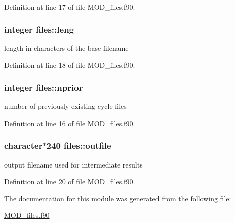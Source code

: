 Definition at line 17 of file M\-O\-D\-\_\-files.\-f90.

\hypertarget{classfiles_af9be68aa5c55ff7ddb877ea03560ccdc}{
\subsubsection[{leng}]{\setlength{\rightskip}{0pt plus 5cm}integer files\-::leng}}\label{classfiles_af9be68aa5c55ff7ddb877ea03560ccdc}


length in characters of the base filename 



Definition at line 18 of file M\-O\-D\-\_\-files.\-f90.

\hypertarget{classfiles_ac7f9a096a71e77d55c9a013df61bd110}{
\subsubsection[{nprior}]{\setlength{\rightskip}{0pt plus 5cm}integer files\-::nprior}}\label{classfiles_ac7f9a096a71e77d55c9a013df61bd110}


number of previously existing cycle files 



Definition at line 16 of file M\-O\-D\-\_\-files.\-f90.

\hypertarget{classfiles_a6462c022456a36144ec8a11250b87eeb}{
\subsubsection[{outfile}]{\setlength{\rightskip}{0pt plus 5cm}character$\ast$240 files\-::outfile}}\label{classfiles_a6462c022456a36144ec8a11250b87eeb}


output filename used for intermediate results 



Definition at line 20 of file M\-O\-D\-\_\-files.\-f90.



The documentation for this module was generated from the following file\-:\begin{DoxyCompactItemize}
\item 
\hyperlink{MOD__files_8f90}{M\-O\-D\-\_\-files.\-f90}\end{DoxyCompactItemize}
